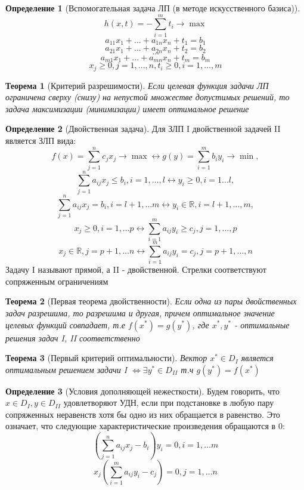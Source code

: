 \documentclass[a4paper]{article}
\newtheorem{theorem}{Теорема}[section]
\theoremstyle{definition}
\newtheorem*{definition}{Определение}
\theoremstyle{remark}
\begin{document}
\begin{definition}[Вспомогательная задача ЛП (в методе искусственного базиса)]
	\[h(x, t) = -\sum_{i = 1}^m t_i\to \max\]
	\[a_{11}x_1 + ... + a_{1n}x_n + t_1 = b_1\]
	\[a_{21}x_1 + ... + a_{2n}x_n + t_2 = b_2\]
	\[\dots\]
	\[a_{m1}x_1 + ... + a_{mn}x_n + t_m = b_m\]
	\[x_j\ge 0, j = 1, ..., n, t_i\ge 0, i = 1, \dots, m\]
\end{definition}
\begin{theorem}[Критерий разрешимости]
	Если целевая функция задачи ЛП ограничена сверху (снизу) на непустой множестве
	допустимых решений, то задача максимизации (минимизации) имеет оптимальное
	решение
\end{theorem}
\begin{definition}[Двойственная задача]
	Для ЗЛП I двойственной задачей II является ЗЛП вида:
	$$f(x) = \sum_{j = 1}^n c_j x_j \to \max \leftrightarrow g(y) = \sum_{i = 1}^m b_i y_i\to \min,$$
	$$\sum_{j = 1}^n a_{ij} x_j \leq b_i, i = 1, \dots, l \leftrightarrow y_i\geq 0, i = 1...l,$$
	$$\sum_{j = 1}^n a_{ij} x_j = b_i, i = l+1, \dots m \leftrightarrow y_i\in \mathbb{R}, i = l+1, \dots, m,$$
	$$x_j\geq 0, i = 1, \dots p\leftrightarrow \sum_{i = 1}^m a_{ij} y_i \geq c_j, j = 1, \dots, p$$
	$$x_j \in \mathbb{R}, j = p+1, \dots n \leftrightarrow \sum_{i = 1}^m a_{ij} y_i = c_j, j = p+1, \dots, n$$
	Задачу I называют прямой, а II - двойственной. Стрелки соответствуют сопряженным ограничениям
\end{definition}
\begin{theorem}[Первая теорема двойственности]
	Если одна из пары двойственных задач разрешима, то разрешима и другая, причем оптимальное значение целевых функций совпадает, т.е $f(x^*) = g(y^*)$, где $x^*, y^*$ - оптимальные решения задач I, II соответственно
\end{theorem}
\begin{theorem}[Первый критерий оптимальности]
	Вектор $x^* \in D_I$ является оптимальным решением задачи
	I $\Leftrightarrow \exists y^* \in D_{II}$ т.ч  $g(y^*) = f(x^*)$
\end{theorem}
\begin{definition}[Условия дополняющей нежесткости]
	Будем говорить, что $x\in D_I, y \in D_{II}$ удовлетворяют УДН, если при подстановке в любую пару сопряженных неравенств хотя бы одно из них обращается в равенство. Это означает, что следующие характеристические произведения обращаются в 0:
	\[(\sum_{j = 1}^n a_{ij}x_j - b_i)y_i = 0, i  = 1, \dots m\]
	\[x_j (\sum_{i = 1}^m a_{ij}y_i - c_j) = 0, j = 1, \dots n\]
\end{definition}
\end{document}
